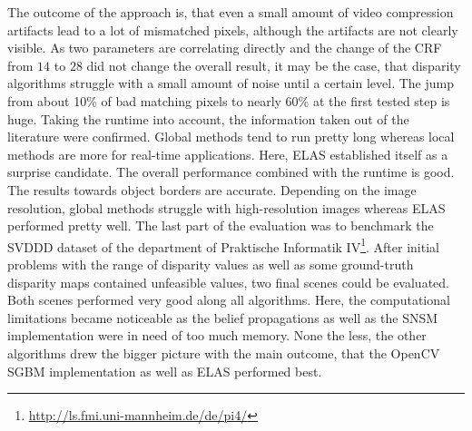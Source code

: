 The outcome of the approach is, that even a small amount of video compression artifacts lead to a lot of mismatched pixels, although the artifacts are not clearly visible.
As two parameters are correlating directly and the change of the CRF from $14$ to $28$ did not change the overall result, it may be the case, that disparity algorithms struggle with a small amount of noise until a certain level.
The jump from about 10\% of bad matching pixels to nearly 60\% at the first tested step is huge.
\newline\newline\noindent Taking the runtime into account, the information taken out of the literature were confirmed.
Global methods tend to run pretty long whereas local methods are more for real-time applications.
Here, ELAS established itself as a surprise candidate.
The overall performance combined with the runtime is good.
The results towards object borders are accurate.
Depending on the image resolution, global methods struggle with high-resolution images whereas ELAS performed pretty well.
\newline\newline\noindent The last part of the evaluation was to benchmark the SVDDD dataset of the department of Praktische Informatik IV\footnote{\url{http://ls.fmi.uni-mannheim.de/de/pi4/}}.
After initial problems with the range of disparity values as well as some ground-truth disparity maps contained unfeasible values, two final scenes could be evaluated.
Both scenes performed very good along all algorithms.
Here, the computational limitations became noticeable as the belief propagations as well as the SNSM implementation were in need of too much memory.
None the less, the other algorithms drew the bigger picture with the main outcome, that the OpenCV SGBM implementation as well as ELAS performed best.
